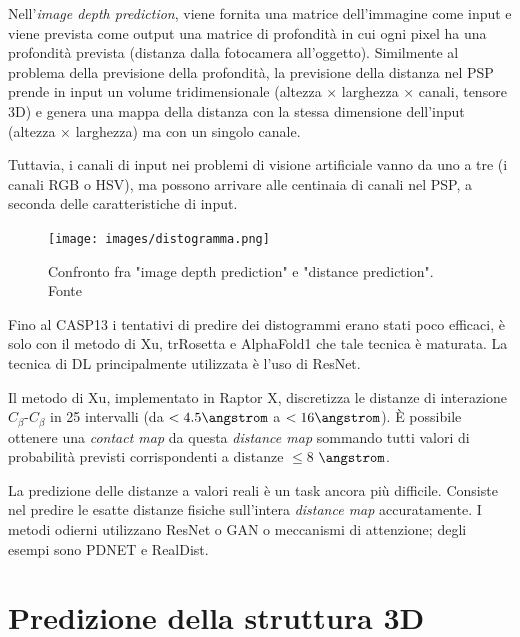 \par Nell'\textit{image depth prediction}, viene fornita una matrice dell'immagine come input e viene prevista come output una matrice di profondità in cui ogni pixel ha una profondità prevista (distanza dalla fotocamera all'oggetto). Similmente al problema della previsione della profondità, la previsione della distanza nel PSP prende in input un volume tridimensionale (altezza × larghezza × canali, tensore 3D) e genera una mappa della distanza con la stessa dimensione dell'input (altezza × larghezza) ma con un singolo canale. 

\par Tuttavia, i canali di input nei problemi di visione artificiale vanno da uno a tre (i canali RGB o HSV), ma possono arrivare alle centinaia di canali nel PSP, a seconda delle caratteristiche di input.

\begin{figure}[!htb]
	\centering
	\texttt{[image: images/distogramma.png]}
	\caption{Confronto fra "image depth prediction" e "distance prediction". Fonte\cite{pakhrin2021deep}}
	\label{fig:distogramma-cane}
\end{figure}

\par Fino al CASP13 i tentativi di predire dei distogrammi erano stati poco efficaci, è solo con il metodo di Xu, trRosetta e AlphaFold1 che tale tecnica è maturata. La tecnica di DL principalmente utilizzata è l'uso di ResNet.

\par Il metodo di Xu, implementato in Raptor X, discretizza le distanze di interazione $C_{\beta}$-$C_{\beta}$ in 25 intervalli (da $< 4.5 \angstrom$ a $< 16 \angstrom$). È possibile ottenere una \textit{contact map} da questa \textit{distance map} sommando tutti valori di probabilità previsti corrispondenti a distanze $\leq 8$ $\angstrom$\supercite{pakhrin2021deep}. \\

\par La predizione delle distanze a valori reali è un task ancora più difficile. Consiste nel predire le esatte distanze fisiche sull'intera \textit{distance map} accuratamente. I metodi odierni utilizzano ResNet o GAN o meccanismi di attenzione; degli esempi sono PDNET e RealDist.

\section{Predizione della struttura 3D}

